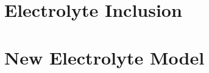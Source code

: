 \section{Electrolyte Inclusion}\label{sec:electrolyteinclusion}


\section{New Electrolyte Model}\label{sec:newelectrolytemodel}




